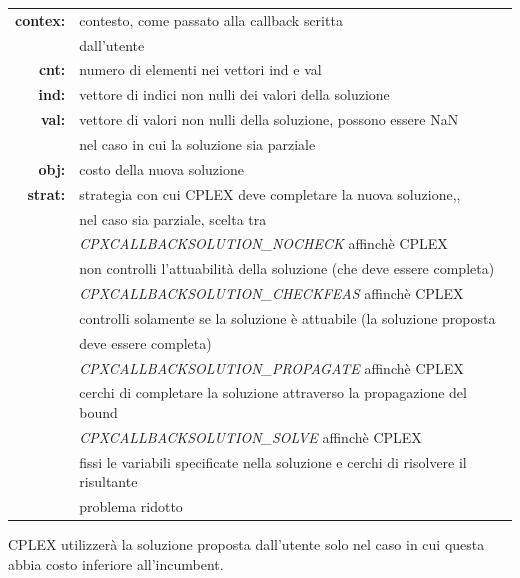 \begin{table}[h]
\centering
\begin{tabular}{rl}
\textbf{contex:} & {contesto, come passato alla callback scritta}\\
&{dall'utente}\\
\textbf{cnt:} & {numero di elementi nei vettori ind e val}\\
\textbf{ind:} & {vettore di indici non nulli dei valori della soluzione}\\
\textbf{val:} & {vettore di valori non nulli della soluzione, possono essere NaN}\\
&{nel caso in cui la soluzione sia parziale}\\
\textbf{obj:} & {costo della nuova soluzione}\\
\textbf{strat:} & {strategia con cui CPLEX deve completare la nuova soluzione,,}\\
&{ nel caso sia parziale, scelta tra}\\
&{\textit{CPXCALLBACKSOLUTION\_NOCHECK} affinchè CPLEX}\\ 
&{non controlli l'attuabilità della soluzione (che deve essere completa) }\\
&{\textit{CPXCALLBACKSOLUTION\_CHECKFEAS} affinchè CPLEX}\\
&{ controlli solamente se la soluzione è attuabile (la soluzione proposta }\\
&{deve essere completa)}\\
&{\textit{CPXCALLBACKSOLUTION\_PROPAGATE} affinchè CPLEX }\\
&{cerchi di completare la soluzione attraverso la propagazione del bound}\\
&{\textit{CPXCALLBACKSOLUTION\_SOLVE} affinchè CPLEX}\\ 
&{fissi le variabili specificate nella soluzione e cerchi di risolvere il risultante }\\
&{problema ridotto}\\
\end{tabular}
\end{table}
CPLEX utilizzerà la soluzione proposta dall'utente solo nel caso in cui questa abbia costo inferiore all'incumbent. 


